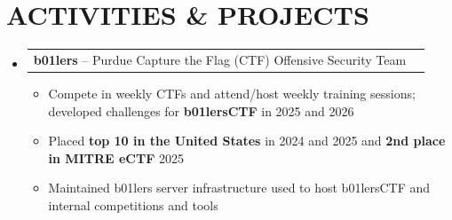 \documentclass[letterpaper,11pt]{article}
\makeatletter
\newcommand{\resumeItem}[1]{
  \item\small{
    {#1 \vspace{-1pt}}
  }
}
\newcommand{\resumeProjectHeading}[2]{
    \item
    \begin{tabular*}{\textwidth}{l@{\extracolsep{\fill}}r}
      #1 & {\color{dark-grey}} \\
    \end{tabular*}\vspace{-4pt}
}
\newcommand{\resumeSubHeadingListStart}{\begin{itemize}[leftmargin=0in, label={}]}
\newcommand{\resumeSubHeadingListEnd}{\end{itemize}}
\newcommand{\resumeItemListStart}{\begin{itemize}}
\newcommand{\resumeItemListEnd}{\end{itemize}\vspace{0pt}}
\makeatother
\begin{document}
\section{ACTIVITIES \& PROJECTS}
    \resumeSubHeadingListStart
      \resumeProjectHeading
          {\textbf{b01lers} -- Purdue Capture the Flag (CTF) Offensive Security Team}{2024 -- Present}
          \resumeItemListStart
            \resumeItem{Compete in weekly CTFs and attend/host weekly training sessions; developed challenges for \textbf{b01lersCTF} in 2025 and 2026}
            \resumeItem{Placed \textbf{top 10 in the United States} in 2024 and 2025 and \textbf{2nd place in MITRE eCTF} 2025}
            \resumeItem{Maintained b01lers server infrastructure used to host b01lersCTF and internal competitions and tools}
          \resumeItemListEnd


    \resumeSubHeadingListEnd




\end{document}
